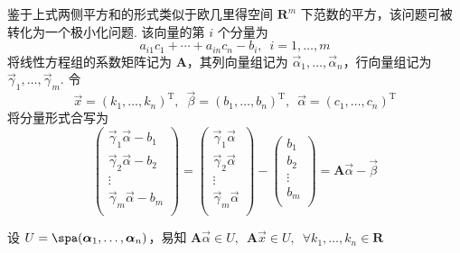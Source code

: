 鉴于上式两侧平方和的形式类似于欧几里得空间 $ \mathbf{R}^{m} $ 下范数的平方，该问题可被转化为一个极小化问题. 该向量的第 $ i $ 个分量为
\[a_{i1}c_1 + \cdots  + a_{in}c_n - b_i, \enspace i = 1, \ldots , m\]
将线性方程组的系数矩阵记为 $ \mathbf{A} $，其列向量组记为 $ \vec{\alpha} _1 , \ldots , \vec{\alpha} _n $，行向量组记为 $ \vec{\gamma} _1 , \ldots , \vec{\gamma} _m $. 令
\[ \vec{x} = (k_1, \ldots , k_n)^{\mathrm{T}}, \enspace \vec{\beta} = (b_1, \ldots , b_n)^{\mathrm{T}}, \enspace \vec{\alpha} = (c_1, \ldots , c_n)^{\mathrm{T}}\]
将分量形式合写为
\[ \begin{pmatrix}
        \vec{\gamma} _1\vec{\alpha} - b_1 \\
        \vec{\gamma} _2\vec{\alpha} - b_2 \\
        \vdots                            \\
        \vec{\gamma} _m\vec{\alpha} - b_m \\
    \end{pmatrix}
    =
    \begin{pmatrix}
        \vec{\gamma} _1\vec{\alpha} \\
        \vec{\gamma} _2\vec{\alpha} \\
        \vdots                      \\
        \vec{\gamma} _m\vec{\alpha} \\
    \end{pmatrix}
    -
    \begin{pmatrix}
        b_1    \\
        b_2    \\
        \vdots \\
        b_m    \\
    \end{pmatrix}
    = \mathbf{A}\vec{\alpha} - \vec{\beta} \]

设 $ U = \spa(\vec{\alpha} _1 , \ldots , \vec{\alpha} _n)$，易知 $ \mathbf{A}\vec{\alpha} \in U , \enspace \mathbf{A}\vec{x} \in U , \enspace \forall k_1, \ldots , k_n \in \mathbf{R}$


